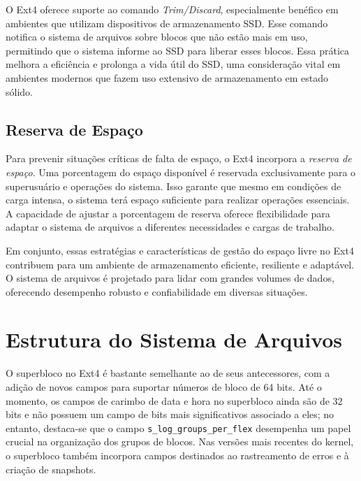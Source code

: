 \documentclass[
	12pt,				%
	openright,			%
	oneside,			%
	a4paper,			%
	chapter=TITLE,		%
	english,			%
	french,				%
	spanish,			%
	brazil				%
	]{abntex2}
\theoremstyle{definition}
\begin{document}
O Ext4 oferece suporte ao comando \textit{Trim/Discard}, especialmente benéfico em ambientes que utilizam dispositivos de armazenamento SSD. Esse comando notifica o sistema de arquivos sobre blocos que não estão mais em uso, permitindo que o sistema informe ao SSD para liberar esses blocos. Essa prática melhora a eficiência e prolonga a vida útil do SSD, uma consideração vital em ambientes modernos que fazem uso extensivo de armazenamento em estado sólido.

\section{Reserva de Espaço}

Para prevenir situações críticas de falta de espaço, o Ext4 incorpora a \textit{reserva de espaço}. Uma porcentagem do espaço disponível é reservada exclusivamente para o superusuário e operações do sistema. Isso garante que mesmo em condições de carga intensa, o sistema terá espaço suficiente para realizar operações essenciais. A capacidade de ajustar a porcentagem de reserva oferece flexibilidade para adaptar o sistema de arquivos a diferentes necessidades e cargas de trabalho.

Em conjunto, essas estratégias e características de gestão do espaço livre no Ext4 contribuem para um ambiente de armazenamento eficiente, resiliente e adaptável. O sistema de arquivos é projetado para lidar com grandes volumes de dados, oferecendo desempenho robusto e confiabilidade em diversas situações.

\chapter{Estrutura do Sistema de Arquivos}

O superbloco no Ext4 é bastante semelhante ao de seus antecessores, com a adição de novos campos para 
suportar números de bloco de 64 bits. Até o momento, os campos de carimbo de data e hora no superbloco 
ainda são de 32 bits e não possuem um campo de bits mais significativos associado a eles; no entanto, 
destaca-se que o campo \texttt{s\_log\_groups\_per\_flex} desempenha um papel crucial na organização 
dos grupos de blocos. Nas versões mais recentes do kernel, o superbloco também incorpora campos 
destinados ao rastreamento de erros e à criação de snapshots.
\end{document}
